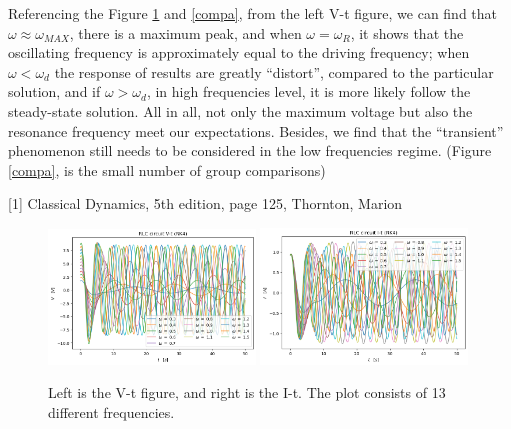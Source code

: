 \documentclass[12pt]{article}
\begin{document}
    Referencing the Figure \ref{Compa} and \ref{compa}, from the left V-t figure, we can find that $\omega \approx \omega_{MAX}$, there is a maximum peak, and when $\omega = \omega_{R}$, it shows that the oscillating frequency is approximately equal to the driving frequency; when $\omega < \omega_{d}$ the response of results are greatly ``distort'', compared to the particular solution, and if $\omega > \omega_{d}$, in high frequencies level, it is more likely follow the steady-state solution. All in all, not only the maximum voltage but also the resonance frequency meet our expectations. Besides, we find that the ``transient'' phenomenon still needs to be considered in the low frequencies regime. (Figure \ref{compa}, is the small number of group comparisons)

    \vspace{5cm}

    \footnotesize{[1] Classical Dynamics, 5th edition, page 125, Thornton, Marion}

      \begin{figure}[H]
        \centering 
        \includegraphics[width = 0.49\textwidth]{4V_tot.png}
        \includegraphics[width = 0.49\textwidth]{4I_tot.png}
        \caption{Left is the V-t figure, and right is the I-t. The plot consists of 13 different frequencies.}
        \label{Compa}
      \end{figure}
\end{document}
